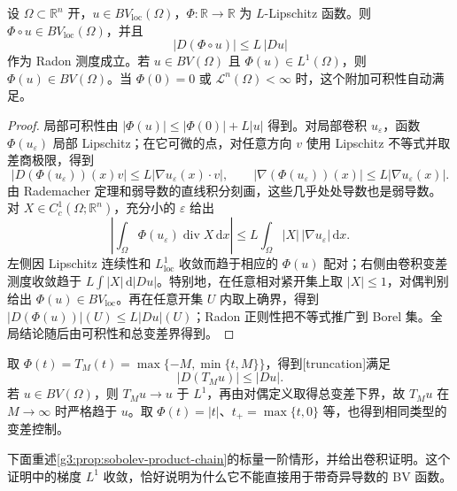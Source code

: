 \begin{proposition}\label{g3:prop:bv-lipschitz-composition}
	设 \(\Omega\subset\mathbb R^n\) 开，\(u\in BV_{\mathrm{loc}}(\Omega)\)，\(\Phi:\mathbb R\to\mathbb R\) 为 \(L\)-Lipschitz 函数。则 \(\Phi\circ u\in BV_{\mathrm{loc}}(\Omega)\)，并且
	\begin{equation}\label{g3:eq:bv-lipschitz-composition}
		|D(\Phi\circ u)|\le L\,|Du|
	\end{equation}
	作为 Radon 测度成立。若 \(u\in BV(\Omega)\) 且 \(\Phi(u)\in L^1(\Omega)\)，则 \(\Phi(u)\in BV(\Omega)\)。当 \(\Phi(0)=0\) 或 \(\mathcal L^n(\Omega)<\infty\) 时，这个附加可积性自动满足。
\end{proposition}
\begin{proof}
	局部可积性由 \(|\Phi(u)|\le|\Phi(0)|+L|u|\) 得到。对局部卷积 \(u_\varepsilon\)，函数 \(\Phi(u_\varepsilon)\) 局部 Lipschitz；在它可微的点，对任意方向 \(v\) 使用 Lipschitz 不等式并取差商极限，得到
	\[
		|D(\Phi(u_\varepsilon))(x)v|
		\le L|\nabla u_\varepsilon(x)\cdot v|,
		\qquad
		|\nabla(\Phi(u_\varepsilon))(x)|\le L|\nabla u_\varepsilon(x)|.
	\]
	由 Rademacher 定理和弱导数的直线积分刻画，这些几乎处处导数也是弱导数。对 \(X\in C_c^1(\Omega;\mathbb R^n)\)，充分小的 \(\varepsilon\) 给出
	\[
		\left|\int_\Omega\Phi(u_\varepsilon)\operatorname{div}X\,\mathrm dx\right|
		\le L\int_\Omega|X|\,|\nabla u_\varepsilon|\,\mathrm dx.
	\]
	左侧因 Lipschitz 连续性和 \(L^1_{\mathrm{loc}}\) 收敛而趋于相应的 \(\Phi(u)\) 配对；右侧由卷积变差测度收敛趋于 \(L\int|X|\,\mathrm d|Du|\)。特别地，在任意相对紧开集上取 \(|X|\le1\)，对偶判别给出 \(\Phi(u)\in BV_{\mathrm{loc}}\)。再在任意开集 \(U\) 内取上确界，得到
	\(|D(\Phi(u))|(U)\le L|Du|(U)\)；Radon 正则性把不等式推广到 Borel 集。全局结论随后由可积性和总变差界得到。
\end{proof}

取 \(\Phi(t)=T_M(t)=\max\{-M,\min\{t,M\}\}\)，得到[truncation]满足
\[
	|D(T_Mu)|\le|Du|.
\]
若 \(u\in BV(\Omega)\)，则 \(T_Mu\to u\) 于 \(L^1\)，再由对偶定义取得总变差下界，故 \(T_Mu\) 在 \(M\to\infty\) 时严格趋于 \(u\)。取 \(\Phi(t)=|t|\)、\(t_+=\max\{t,0\}\) 等，也得到相同类型的变差控制。

下面重述\cref{g3:prop:sobolev-product-chain}的标量一阶情形，并给出卷积证明。这个证明中的梯度 \(L^1\) 收敛，恰好说明为什么它不能直接用于带奇异导数的 BV 函数。

